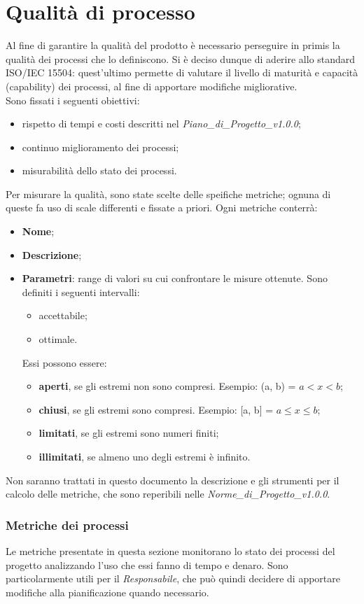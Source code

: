 \section{Qualità di processo}
Al fine di garantire la qualità del prodotto è necessario perseguire in primis la qualità dei processi che lo definiscono. Si è deciso dunque di aderire allo standard ISO/IEC 15504: quest'ultimo permette di valutare il livello di maturità e capacità (capability) dei processi, al fine di apportare modifiche migliorative. \\
Sono fissati i seguenti obiettivi: \begin{itemize}
\item rispetto di tempi e costi descritti nel \textit{Piano\_di\_Progetto\_v1.0.0};
\item continuo miglioramento dei processi;
\item misurabilità dello stato dei processi.
\end{itemize}
Per misurare la qualità, sono state scelte delle speifiche metriche; ognuna di queste fa uso di scale differenti e fissate a priori. Ogni metriche conterrà:
\begin{itemize}
\item \textbf{Nome};
\item \textbf{Descrizione};
\item \textbf{Parametri}: range di valori su cui confrontare le misure ottenute. Sono definiti i seguenti intervalli: \begin{itemize}
\item accettabile;
\item ottimale.
\end{itemize}
Essi possono essere: \begin{itemize}
\item \textbf{aperti}, se gli estremi non sono compresi. Esempio: (a, b) = $a < x < b$; 
\item \textbf{chiusi}, se gli estremi sono compresi. Esempio: [a, b] = $a \leq x \leq b$;
\item \textbf{limitati}, se gli estremi sono numeri finiti;
\item \textbf{illimitati}, se almeno uno degli estremi è infinito.
\end{itemize}
\end{itemize}
Non saranno trattati in questo documento la descrizione e gli strumenti per il calcolo delle metriche, che sono reperibili nelle \textit{Norme\_di\_Progetto\_v1.0.0}.

\subsubsection{Metriche dei processi}
Le metriche presentate in questa sezione monitorano lo stato dei processi del progetto analizzando l’uso
che essi fanno di tempo e denaro. Sono particolarmente utili per il \textit{Responsabile}, che può quindi decidere di apportare modifiche alla pianificazione quando necessario.


